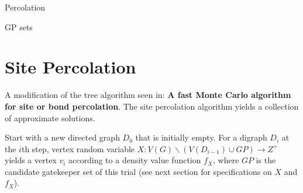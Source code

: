 \documentclass[a4paper]{article}
\begin{document}
\begin{algorithm}
\caption{Percolation}\label{euclid}
\begin{algorithmic}
	
	\EndFunction
	
	\Return GP sets
	
	\EndFunction
	
	\EndFunction
	
		\EndFunction
	\EndFunction 
\EndFor 

\end{algorithmic}
\end{algorithm}

\section*{Site Percolation}

A modification of the tree algorithm seen in: {\bf A fast Monte Carlo algorithm for site or bond percolation}. The site percolation algorithm yields a collection of approximate solutions. 

Start with a new directed graph $D_0$ that is initially empty. For a digraph $D_i$ at the $i$th step, vertex random variable $X: V(G)\backslash (V(D_{i-1}) \cup GP) \rightarrow Z^+ $ yields a vertex $v_i$ according to a density value function $f_X$, where $GP$ is the candidate gatekeeper set of this trial (see next section for specifications on $X$ and $f_X$). %

\end{document}
